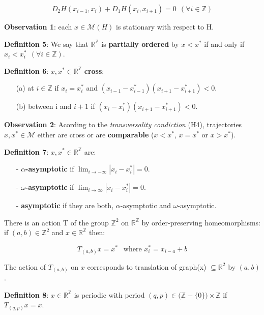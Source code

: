 \documentclass{article}
\begin{document}
	$$	
		D_2 H( x_{i -1}, x_{i}) + D_1 H( x_{i}, x_{i + 1}) = 0 \ \ (\forall i \in \mathbb{Z}) 
	$$
	
\noindent \textbf{Observation 1}: each $x \in \mathcal{M}(H)$ is stationary with respect to H.

\noindent \textbf{Definition 5}: We say that $\mathbb{R}^{\mathbb{Z}}$ is \textbf{partially ordered} by $x < x^{*}$ if and only if $x_{i} < x_{i}^{*} \ \ (\forall i \in \mathbb{Z})$.


\noindent \textbf{Definition 6}: $x, x^{*} \in \mathbb{R}^{\mathbb{Z}}$ \textbf{cross}:
	\begin{itemize}
		\item[(a)] at $i \in \mathbb{Z}$ if $x_i = x_{i}^{*}$ and $(x_{i - 1} - x^{*}_{i - 1}) (x_{i + 1} - x^{*}_{i + 1}) < 0 $.
		\item[(b)] between i and $i + 1$ if $(x_{i} - x^{*}_{i}) (x_{i + 1} - x^{*}_{i + 1}) < 0 $.
	\end{itemize}

\noindent \textbf{Observation 2}: Acording to the \textit{transversality condiction} (H4), trajectories $x, x^{*} \in \mathcal{M}$ either are cross or are \textbf{comparable} ($x < x^{*}$, $x = x^{*}$ or $x > x^{*}$).  

\noindent \textbf{Definition 7}:  $x, x^{*} \in \mathbb{R}^{\mathbb{Z}}$ are:
	\begin{itemize}
		\item[-] \textbf{$\alpha$-asymptotic} if $\lim_{i \rightarrow - \infty} | x_i - x_{i}^{*} | = 0$.
		\item[-] \textbf{$\omega$-asymptotic} if $\lim_{i \rightarrow  \infty} | x_i - x_{i}^{*} | = 0$.
		\item[-] \textbf{asymptotic} if they are both, $\alpha$-asymptotic and $\omega$-asymptotic.
	\end{itemize}


\noindent There is an action T of the group $\mathbb{Z}^2$ on $\mathbb{R}^{\mathbb{Z}}$ by order-preserving homeomorphisms: if $(a, b) \in \mathbb{Z}^{2}$ and $x \in \mathbb{R}^{\mathbb{Z}}$ then:

	$$
		T_{(a, b)} x = x^{*} \ \ \text{  where  } x^{*}_{i} = x_{i - a} + b
	$$

The action of $T_{(a, b)}$ on $x$ corresponds to translation of graph(x) $\subseteq \mathbb{R}^{2}$ by $(a, b)$.

\noindent \textbf{Definition 8}: $x \in \mathbb{R}^{\mathbb{Z}}$ is periodic with period $(q, p) \in \big( \mathbb{Z} - \{ 0 \} \big) \times \mathbb{Z}$ if $T_{(q, p)} x = x$.
\end{document}
